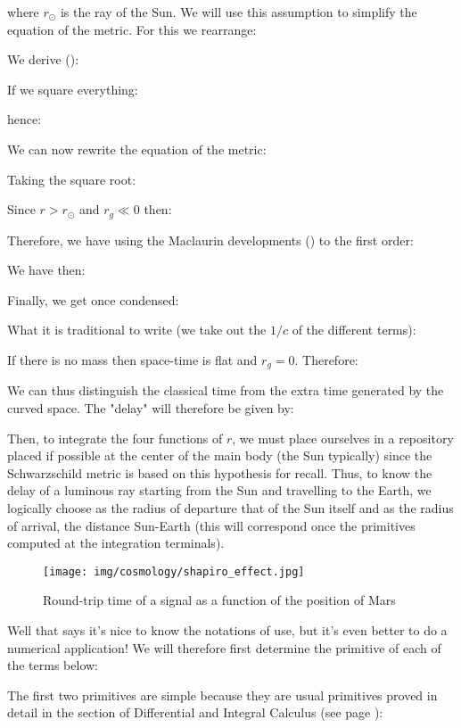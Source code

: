 	where $r_\odot$ is the ray of the Sun. We will use this assumption to simplify the equation of the metric. For this we rearrange:
	
	We derive ():
	
	If we square everything:
	
	hence:
	
	We can now rewrite the equation of the metric:
	
	Taking the square root:
	
	Since $r>r_\odot$ and $r_g\ll 0$ then:
	
	Therefore, we have using the Maclaurin developments () to the first order:
	
	We have then:
	
	Finally, we get once condensed:
	
	What it is traditional to write (we take out the $1 / c$ of the different terms):
	
	If there is no mass then space-time is flat and $r_g=0$. Therefore:
	
	We can thus distinguish the classical time from the extra time generated by the curved space. The "delay" will therefore be given by:
	
	Then, to integrate the four functions of $r$, we must place ourselves in a repository placed if possible at the center of the main body (the Sun typically) since the Schwarzschild metric is based on this hypothesis for recall. Thus, to know the delay of a luminous ray starting from the Sun and travelling to the Earth, we logically choose as the radius of departure that of the Sun itself and as the radius of arrival, the distance Sun-Earth (this will correspond once the primitives computed at the integration terminals).
	\begin{figure}[H]
		\centering
		\texttt{[image: img/cosmology/shapiro\_effect.jpg]}	
		\caption{Round-trip time of a signal as a function of the position of Mars}
	\end{figure}
	Well that says it's nice to know the notations of use, but it's even better to do a numerical application! We will therefore first determine the primitive of each of the terms below:
	
	The first two primitives are simple because they are usual primitives proved in detail in the section of Differential and Integral Calculus (see page \pageref{usual primitives}):
	
